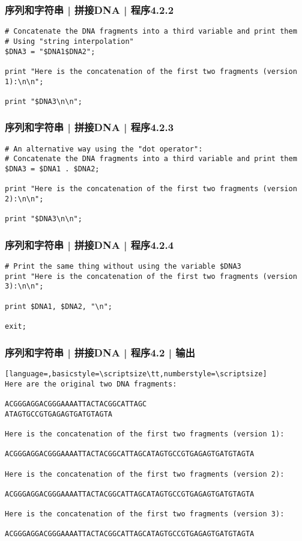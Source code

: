 \begin{frame}[fragile,label=exam4.2.2]
  \frametitle{序列和字符串 | 拼接DNA | 程序4.2.2}
\begin{lstlisting}[firstnumber=15]
# Concatenate the DNA fragments into a third variable and print them
# Using "string interpolation"
$DNA3 = "$DNA1$DNA2";

print "Here is the concatenation of the first two fragments (version 1):\n\n";

print "$DNA3\n\n";
\end{lstlisting}
\end{frame}

\begin{frame}[fragile,label=exam4.2.3]
  \frametitle{序列和字符串 | 拼接DNA | 程序4.2.3}
\begin{lstlisting}[firstnumber=23]
# An alternative way using the "dot operator":
# Concatenate the DNA fragments into a third variable and print them
$DNA3 = $DNA1 . $DNA2;

print "Here is the concatenation of the first two fragments (version 2):\n\n";

print "$DNA3\n\n";
\end{lstlisting}
\end{frame}

\begin{frame}[fragile,label=exam4.2.4]
  \frametitle{序列和字符串 | 拼接DNA | 程序4.2.4}
\begin{lstlisting}[firstnumber=31]
# Print the same thing without using the variable $DNA3
print "Here is the concatenation of the first two fragments (version 3):\n\n";

print $DNA1, $DNA2, "\n";

exit;
\end{lstlisting}
\end{frame}

\begin{frame}[fragile]
  \frametitle{序列和字符串 | 拼接DNA | 程序4.2 | 输出}
\begin{lstlisting}[language=,basicstyle=\scriptsize\tt,numberstyle=\scriptsize]
Here are the original two DNA fragments:

ACGGGAGGACGGGAAAATTACTACGGCATTAGC
ATAGTGCCGTGAGAGTGATGTAGTA

Here is the concatenation of the first two fragments (version 1):

ACGGGAGGACGGGAAAATTACTACGGCATTAGCATAGTGCCGTGAGAGTGATGTAGTA

Here is the concatenation of the first two fragments (version 2):

ACGGGAGGACGGGAAAATTACTACGGCATTAGCATAGTGCCGTGAGAGTGATGTAGTA

Here is the concatenation of the first two fragments (version 3):

ACGGGAGGACGGGAAAATTACTACGGCATTAGCATAGTGCCGTGAGAGTGATGTAGTA
\end{lstlisting}
\end{frame}

